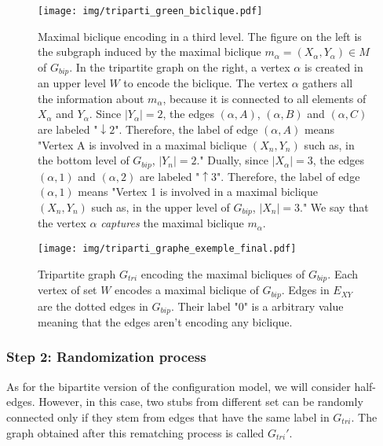 \documentclass[table]{report}
\begin{document}

\begin{figure}[h]%
\centering
\texttt{[image: img/triparti\_green\_biclique.pdf]}
\caption{Maximal biclique encoding in a third level. The figure on the left is the subgraph induced by the maximal biclique $m_\alpha = (X_\alpha, Y_\alpha) \in M$  of $G_{bip}$. In the tripartite graph on the right, a vertex $\alpha$ is created in an upper level $W$ to encode the biclique. The vertex $\alpha$ gathers all the information about $m_\alpha$, because it is connected to all elements of $X_\alpha$ and $Y_\alpha$. Since $|Y_\alpha| =  2$, the edges $(\alpha,A)$, $(\alpha,B)$ and $(\alpha,C)$ are labeled "$\downarrow 2$". Therefore, the label of edge $(\alpha,A)$ means "Vertex A is involved in a maximal biclique $(X_n, Y_n)$ such as, in the bottom level of $G_{bip}$, $|Y_n| = 2$." Dually, since $|X_\alpha| =  3$, the edges $(\alpha,1)$ and $(\alpha,2)$ are labeled "$\uparrow 3$". Therefore, the label of edge $(\alpha,1)$ means "Vertex 1 is involved in a maximal biclique $(X_n, Y_n)$ such as, in the upper level of $G_{bip}$, $|X_n| = 3$." We say that the vertex $\alpha$ \textit{captures} the maximal biclique $m_\alpha$.}
\label{fig:directed_weighted_examples}
\end{figure}
\FloatBarrier


\begin{figure}[h]%
\centering
\texttt{[image: img/triparti\_graphe\_exemple\_final.pdf]}
\caption{Tripartite graph ${G_{tri}}$ encoding the maximal bicliques of $G_{bip}$. Each vertex of set $W$ encodes a maximal biclique of $G_{bip}$. Edges in $E_{XY}$ are the dotted edges in $G_{bip}$. Their label "0" is a arbitrary value meaning that the edges aren't encoding any biclique.}
\label{fig:triparti_graphe_exemple_final}
\end{figure}
\FloatBarrier

\subsubsection{Step 2: Randomization process}

As for the bipartite version of the configuration model, we will consider half-edges. However, in this case, two stubs from different set can be randomly connected only if they stem from edges that have the same label in ${G_{tri}}$. The graph obtained after this rematching process is called ${G_{tri}}'$.
\end{document}
